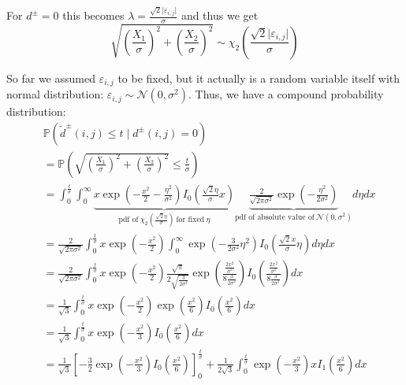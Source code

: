 \documentclass[a4paper,12pt]{article}
\newcommand{\abs}[1]{\lvert#1\rvert}
\theoremstyle{plain}
\theoremstyle{definition}
\theoremstyle{remark}
\begin{document}
	For $d^\pm = 0$ this becomes $\lambda = \frac{\sqrt{2} \abs{\varepsilon_{i, j}}}{\sigma}$ and thus we get
	\begin{equation*}
		\sqrt{\left( \frac{X_1}{\sigma} \right)^2 + \left( \frac{X_2}{\sigma} \right)^2} \sim \chi_2 \left( \frac{\sqrt{2} \abs{\varepsilon_{i, j}}}{\sigma} \right)
	\end{equation*}
	
	So far we assumed $\varepsilon_{i, j}$ to be fixed, but it actually is a random variable itself with normal distribution: $\varepsilon_{i, j} \sim \mathcal{N}(0, \sigma^2)$. Thus, we have a compound probability distribution:
	\begin{align*}
		&\mathbb{P}(\tilde{d}^\pm(i, j) \leq t \mid d^\pm(i, j) = 0) \\
		&= \mathbb{P}\left( \sqrt{\left( \frac{X_1}{\sigma} \right)^2 + \left( \frac{X_2}{\sigma} \right)^2} \leq \frac{t}{\sigma} \right) \\
		&= \int_0^\frac{t}{\sigma} \int_0^\infty \underbrace{x \exp \left( - \frac{x^2}{2} - \frac{\eta^2}{\sigma^2} \right) I_0 \left( \frac{\sqrt{2} \eta}{\sigma} x \right)}_{\textrm{pdf of} \ \chi_2 \left( \frac{\sqrt{2} \eta}{\sigma} \right) \ \textrm{for fixed} \ \eta} \underbrace{\frac{2}{\sqrt{2 \pi \sigma^2}} \exp \left( - \frac{\eta^2}{2 \sigma^2} \right)}_{\textrm{pdf of absolute value of} \ \mathcal{N}(0, \sigma^2)} d\eta dx \\
		&= \frac{2}{\sqrt{2 \pi \sigma^2}} \int_0^\frac{t}{\sigma} x \exp \left( - \frac{x^2}{2} \right) \int_0^\infty \exp \left( - \frac{3}{2 \sigma^2} \eta^2 \right) I_0 \left( \frac{\sqrt{2} x}{\sigma} \eta \right) d\eta dx \\
		&= \frac{2}{\sqrt{2 \pi \sigma^2}} \int_0^\frac{t}{\sigma} x \exp \left( - \frac{x^2}{2} \right) \frac{\sqrt{\pi}}{2 \sqrt{\frac{3}{2 \sigma^2}}} \exp \left( \frac{\frac{2 x^2}{\sigma^2}}{8 \frac{3}{2 \sigma^2}} \right) I_0 \left( \frac{\frac{2 x^2}{\sigma^2}}{8 \frac{3}{2 \sigma^2}} \right) dx \\
		&= \frac{1}{\sqrt{3}} \int_0^\frac{t}{\sigma} x \exp \left( - \frac{x^2}{2} \right) \exp \left( \frac{x^2}{6} \right) I_0 \left( \frac{x^2}{6} \right) dx \\
		&= \frac{1}{\sqrt{3}} \int_0^\frac{t}{\sigma} x \exp \left( - \frac{x^2}{3} \right) I_0 \left( \frac{x^2}{6} \right) dx \\
		&= \frac{1}{\sqrt{3}} \left[ - \frac{3}{2} \exp \left( - \frac{x^2}{3} \right) I_0 \left( \frac{x^2}{6} \right) \right]_0^\frac{t}{\sigma} + \frac{1}{2 \sqrt{3}} \int_0^\frac{t}{\sigma} \exp \left( - \frac{x^2}{3} \right) x I_1 \left( \frac{x^2}{6} \right) dx \\

\end{align*}
\end{document}
